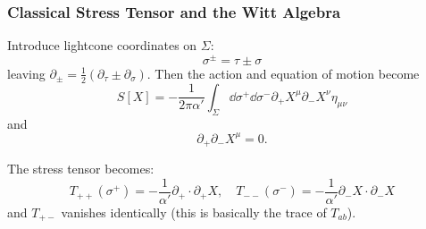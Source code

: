 \documentclass[a4paper,11pt]{article}
\begin{document}
	\subsubsection{Classical Stress Tensor and the Witt Algebra}

	Introduce lightcone coordinates on $\Sigma$:
	\[
		\sigma^\pm = \tau \pm \sigma
	\]
	leaving $\partial_\pm = \frac{1}{2} \left( \partial_\tau \pm \partial_\sigma \right)$. Then the action and equation of motion become
	\[
		S[X] = - \frac{1}{2 \pi \alpha'} \int_\Sigma \dd{\sigma^+} \dd{\sigma^-} \partial_+ X^\mu \partial_- X^\nu \eta _{\mu \nu}
	\]
	and 
	\[
		\partial_+ \partial_- X^\mu = 0.
	\]
	
	The stress tensor becomes:
	\[
		T _{++} (\sigma^+) = - \frac{1}{\alpha'} \partial_+ \cdot \partial_+ X, \quad T _{--} (\sigma^-) = - \frac{1}{\alpha'} \partial_- X \cdot \partial_- X
	\]
	and $T _{+-}$ vanishes identically (this is basically the trace of $T _{a b}$).
	
	
	
	
	
	

	
	
	
\end{document}
